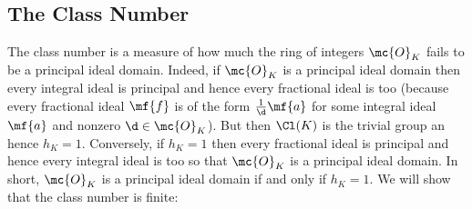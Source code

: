  \subsection*{The Class Number}
    The class number is a measure of how much the ring of integers $\mc{O}_{K}$ fails to be a principal ideal domain. Indeed, if $\mc{O}_{K}$ is a principal ideal domain then every integral ideal is principal and hence every fractional ideal is too (because every fractional ideal $\mf{f}$ is of the form $\frac{1}{\d}\mf{a}$ for some integral ideal $\mf{a}$ and nonzero $\d \in \mc{O}_{K}$). But then $\Cl(K)$ is the trivial group an hence $h_{K} = 1$. Conversely, if $h_{K} = 1$ then every fractional ideal is principal and hence every integral ideal is too so that $\mc{O}_{K}$ is a principal ideal domain. In short, $\mc{O}_{K}$ is a principal ideal domain if and only if $h_{K} = 1$. We will show that the class number is finite:

